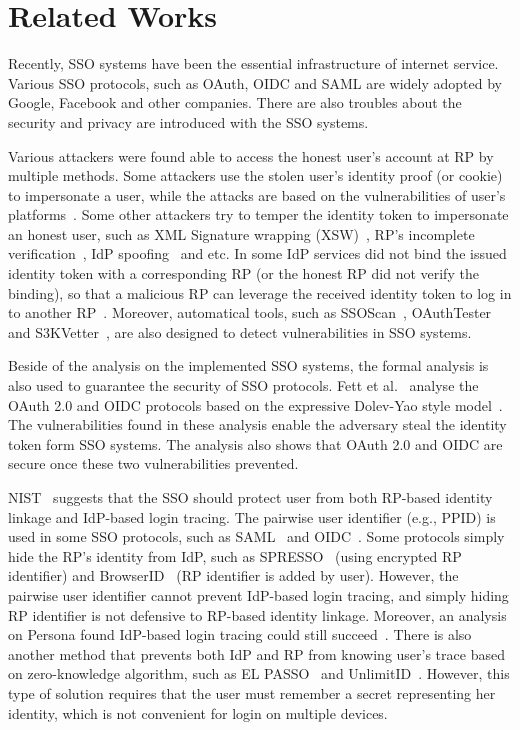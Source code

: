 \section{Related Works}
\label{sec:relatedwork}
Recently, SSO systems have been the essential infrastructure of internet service. Various SSO protocols, such as OAuth, OIDC and SAML are  widely adopted by Google, Facebook and other companies. There are also troubles about the security and privacy are introduced with the SSO systems. 

Various attackers were found able to access the honest user's account at RP by multiple methods. 
Some attackers use the stolen user's identity proof (or cookie) to impersonate a user, while the attacks are based on the vulnerabilities of user's platforms~\cite{WangCW12,ArmandoCCCPS13}.
Some other attackers try to temper the identity token to impersonate an honest user, such as  XML Signature wrapping (XSW)~\cite{SomorovskyMSKJ12}, RP's incomplete verification~\cite{WangCW12,WangZLG16,MainkaMSW17}, IdP spoofing~\cite{MainkaMS16,MainkaMSW17} and etc. 
In some IdP services did not bind the issued identity token with a corresponding RP (or the honest RP did not verify the binding), so that a malicious RP can leverage the received identity token to log in to another RP~\cite{YangLCZ18,WangZLG16,MainkaMS16,MainkaMSW17,YangLCZ18}. 
Moreover, automatical tools, such as SSOScan~\cite{ZhouE14}, OAuthTester~\cite{YangLLZH16} and S3KVetter~\cite{YangLCZ18}, are also designed to detect vulnerabilities in SSO systems.

Beside of the analysis on the implemented SSO systems, the formal analysis is also used to guarantee the security of SSO protocols. Fett et al.~\cite{FettKS16, FettKS17} analyse the OAuth 2.0 and OIDC protocols based on the expressive Dolev-Yao style model~\cite{FettKS14}. The vulnerabilities found in these analysis enable the adversary steal the identity token form SSO systems. The analysis also shows that OAuth 2.0 and OIDC are secure once these two vulnerabilities prevented. 

NIST~\cite{NIST2017draft} suggests that the SSO should protect user from both RP-based identity linkage and IdP-based login tracing. The pairwise user identifier (e.g., PPID) is used in some SSO protocols, such as SAML~\cite{SAML} and OIDC~\cite{OpenIDConnect}. Some protocols simply hide the RP's identity from IdP, such as SPRESSO~\cite{SPRESSO} (using encrypted RP identifier) and BrowserID~\cite{BrowserID} (RP identifier is added by user). However, the pairwise user identifier cannot prevent IdP-based login tracing, and simply hiding RP identifier is not defensive to RP-based identity linkage. Moreover, an analysis on Persona found IdP-based login tracing could still succeed~\cite{FettKS14, BrowserID}.
There is also another method that prevents both IdP and RP from knowing user's trace based on zero-knowledge algorithm, such as EL PASSO~\cite{ZhangKSZR21} and UnlimitID~\cite{IsaakidisHD16}. However, this type of solution requires that the user must remember a secret representing her identity, which is not convenient for login on multiple devices.

